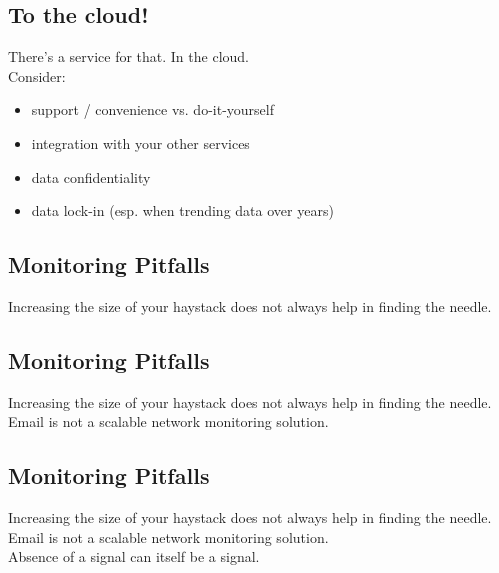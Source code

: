 \documentclass[xga]{xdvislides}
\begin{document}
\subsection{To the cloud!}
There’s a service for that. In the cloud. \\

Consider:
\begin{itemize}
	\item support / convenience vs. do-it-yourself
	\item integration with your other services
	\item data confidentiality
	\item data lock-in (esp. when trending data over years)
\end{itemize}

\subsection{Monitoring Pitfalls}
\vspace*{\fill}
\Huge
\begin{center}
Increasing the size of your haystack does not always
help in finding the needle.
\end{center}
\Normalsize
\vspace*{\fill}

\subsection{Monitoring Pitfalls}
\vspace*{\fill}
\Huge
\begin{center}
Increasing the size of your haystack does not always
help in finding the needle. \\
\vspace{.4in}
Email is not a scalable network monitoring solution.
\end{center}
\Normalsize
\vspace*{\fill}

\subsection{Monitoring Pitfalls}
\vspace*{\fill}
\Huge
\begin{center}
Increasing the size of your haystack does not always
help in finding the needle. \\
\vspace{.4in}
Email is not a scalable network monitoring solution. \\
\vspace{.4in}
Absence of a signal can itself be a signal.
\end{center}
\Normalsize
\vspace*{\fill}
\end{document}
